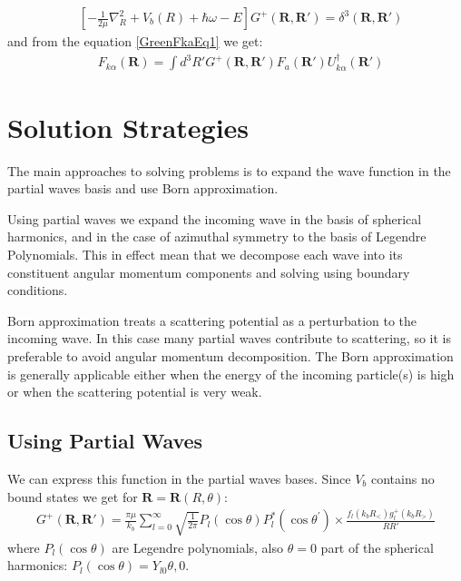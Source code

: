\begin{equation}\label{GreenFkaEq1}
\begin{split}
& \left[-\frac{1}{2\mu}\nabla^2_{R} + V_b(R) + \hbar\omega - E\right]G^{+}(\mathbf{R}, \mathbf{R}') =  \delta^3(\mathbf{R}, \mathbf{R}')
\end{split}
\end{equation}
and from the equation \eqref{GreenFkaEq1} we get:
\begin{equation}\label{FkaInt1}
\begin{split}
& F_{k\alpha}(\mathbf{R}) = \int{d^3R'G^{+}(\mathbf{R}, \mathbf{R}')F_{a}(\mathbf{R}')U^{\dagger}_{k\alpha}(\mathbf{R}')   }
\end{split}
\end{equation}

\section{Solution Strategies}
The main approaches to solving problems is to expand the wave function in the partial waves basis and use Born approximation.

Using partial waves  we expand the incoming wave in the basis of spherical harmonics, and in the case of azimuthal symmetry to the basis of Legendre Polynomials. This in effect mean that we decompose each wave into its constituent angular momentum components and solving using boundary conditions.

Born approximation \cite{GQuantum} treats a scattering potential as a perturbation to the incoming wave. In this case many partial waves contribute to scattering, so it is preferable to avoid angular momentum decomposition. The Born approximation is generally applicable either when the energy of the incoming particle(s) is high or when the scattering potential is very weak. 

\subsection{Using Partial Waves}

We can express this function in the partial waves bases. Since $ V_b $ contains no bound states we get for $ \mathbf{R} = \mathbf{R}(R,\theta) $:
\begin{equation}\label{GreenFka2}
\begin{split}
G^{+}(\mathbf{R}, \mathbf{R}') =  \frac{\pi\mu}{k_b}\sum_{l=0}^{\infty}{\sqrt{\frac{1}{2\pi}} P_l(\cos\theta) P_l^{*}(\cos\theta^{'})}\times \frac{f_l(k_bR_{<})g^{+}_l(k_bR_{>})}{RR'}
\end{split}
\end{equation}
where $ P_l(\cos\theta) $ are Legendre polynomials, also $ \theta = 0 $ part of the spherical harmonics:  $ P_l(\cos\theta) = Y_{l0}{\theta,0} $. 

